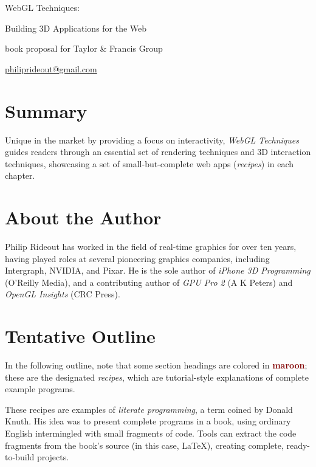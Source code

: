 \thispagestyle{empty}
\label{Proposal}
\LARGE
\noindent WebGL Techniques:

\large
\noindent Building 3D Applications for the Web
\small

\vspace{0.25in}
\noindent book proposal for Taylor \& Francis Group

\noindent \href{mailto:philiprideout@gmail.com}{philiprideout@gmail.com}
\normalsize

\renewcommand{\labelenumi}{Chapter \arabic{enumi}. }

\section*{Summary}
Unique in the market by providing a focus on interactivity, \emph{WebGL Techniques} guides readers through an essential set of rendering techniques and 3D interaction techniques, showcasing a set of small-but-complete web apps (\emph{recipes}) in each chapter.

\section*{About the Author}

Philip Rideout has worked in the field of real-time graphics for over ten years, having played roles at several pioneering graphics companies, including Intergraph, NVIDIA, and Pixar.  He is the sole author of \emph{iPhone 3D Programming} (O'Reilly Media), and a contributing author of \emph{GPU Pro 2} (A K Peters) and \emph{OpenGL Insights} (CRC Press).

\section*{Tentative Outline}

In the following outline, note that some section headings are colored in \textbf{\textcolor{Maroon}{maroon}}; these are the designated \emph{recipes}, which are tutorial-style explanations of complete example programs.

These recipes are examples of \emph{literate programming}, a term coined by Donald Knuth.  His idea was to present complete programs in a book, using ordinary English intermingled with small fragments of code.  Tools can extract the code fragments from the book's source (in this case, \LaTeX), creating complete, ready-to-build projects.

\newcommand{\verbiage}[2] {\item \textbf{#1} \footnotesize#2\normalsize}
\newcommand{\rrecipe}[2] {\item \textbf{\textcolor{Maroon}{#1}} \footnotesize#2\normalsize}
\newcommand{\irecipe}[2] {\item \textbf{\textcolor{Maroon}{#1}} \footnotesize#2\normalsize}
\newcommand{\arecipe}[2] {\item \textbf{\textcolor{Maroon}{#1}} \footnotesize#2\normalsize}

